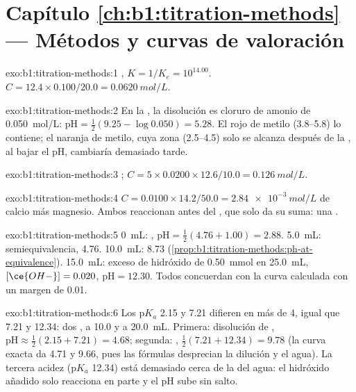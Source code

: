 \section*{Capítulo \ref{ch:b1:titration-methods} --- Métodos y curvas de valoración}

\begin{solution}{exo:b1:titration-methods:1}
, $K = 1/K_e = 10^{14.00}$. $C = 12.4 \times
0.100/20.0 = \qty{0.0620}{mol/L}$.
\end{solution}

\begin{solution}{exo:b1:titration-methods:2}
En la , la disolución es cloruro de amonio de
\qty{0.050}{mol/L}: $\mathrm{pH} = \frac12(9.25 - \log 0.050) = 5.28$. El
rojo de metilo (3.8--5.8) lo contiene; el naranja de metilo, cuya zona
(2.5--4.5) solo se alcanza después de la , al bajar el pH,
cambiaría demasiado tarde.
\end{solution}

\begin{solution}{exo:b1:titration-methods:3}
;
$C = 5 \times 0.0200 \times 12.6/10.0 = \qty{0.126}{mol/L}$.
\end{solution}

\begin{solution}{exo:b1:titration-methods:4}
$C = 0.0100 \times 14.2/50.0 = \qty{2.84e-3}{mol/L}$ de calcio más
magnesio. Ambos reaccionan antes del , que solo da su suma:
una .
\end{solution}

\begin{solution}{exo:b1:titration-methods:5}
0~mL: , $\mathrm{pH} = \frac12(4.76 + 1.00) = 2.88$. 5.0~mL:
semiequivalencia, 4.76. 10.0~mL: 8.73
(\cref{prop:b1:titration-methods:ph-at-equivalence}). 15.0~mL: exceso de
hidróxido de \qty{0.50}{mmol} en \qty{25.0}{mL}, $[\ce{OH-}] = 0.020$,
$\mathrm{pH} = 12.30$. Todos concuerdan con la curva calculada con un
margen de 0.01.
\end{solution}

\begin{solution}{exo:b1:titration-methods:6}
Los $\mathrm{p}K_a$ 2.15 y 7.21 difieren en más de 4, igual que 7.21 y
12.34: dos , a 10.0 y a \qty{20.0}{mL}. Primera: disolución
de , $\mathrm{pH} \approx \frac12(2.15 + 7.21) = 4.68$;
segunda: , $\frac12(7.21 + 12.34) = 9.78$ (la curva exacta da
4.71 y 9.66, pues las fórmulas desprecian la dilución y el agua). La
tercera acidez ($\mathrm{p}K_a$ 12.34) está demasiado cerca de la del
agua: el hidróxido añadido solo reacciona en parte y el pH sube sin
salto.
\end{solution}

